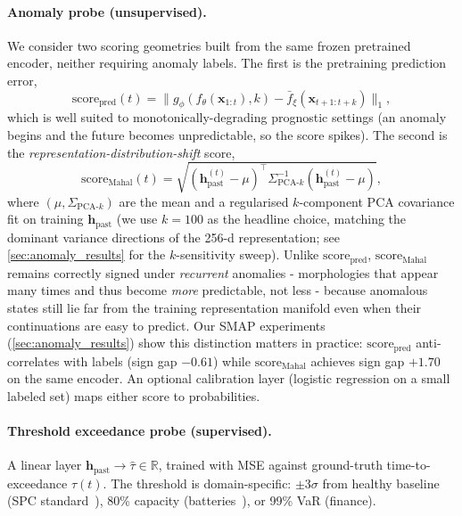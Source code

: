 \documentclass{article}
\newcommand{\R}{\mathbb{R}}
\newcommand{\x}{\mathbf{x}}
\newcommand{\h}{\mathbf{h}}
\newcommand{\encoder}{f_\theta}
\newcommand{\predictor}{g_\phi}
\newcommand{\target}{\bar{f}_\xi}
\begin{document}
\paragraph{Anomaly probe (unsupervised).}
\label{sec:anomaly_probe}
We consider two scoring geometries built from the same frozen pretrained encoder, neither requiring anomaly labels. The first is the pretraining prediction error,
\begin{equation}
  \text{score}_\text{pred}(t) = \|\predictor(\encoder(\x_{1:t}), k) - \target(\x_{t+1:t+k})\|_1,
  \label{eq:anomaly_score}
\end{equation}
which is well suited to monotonically-degrading prognostic settings (an anomaly begins and the future becomes unpredictable, so the score spikes). The second is the \emph{representation-distribution-shift} score,
\begin{equation}
  \text{score}_\text{Mahal}(t) = \sqrt{(\h_\text{past}^{(t)} - \mu)^\top \Sigma_{\text{PCA-}k}^{-1} (\h_\text{past}^{(t)} - \mu)},
  \label{eq:mahalanobis_score}
\end{equation}
where $(\mu, \Sigma_{\text{PCA-}k})$ are the mean and a regularised $k$-component PCA covariance fit on training $\h_\text{past}$ (we use $k=100$ as the headline choice, matching the dominant variance directions of the 256-d representation; see \cref{sec:anomaly_results} for the $k$-sensitivity sweep). Unlike $\text{score}_\text{pred}$, $\text{score}_\text{Mahal}$ remains correctly signed under \emph{recurrent} anomalies - morphologies that appear many times and thus become \emph{more} predictable, not less - because anomalous states still lie far from the training representation manifold even when their continuations are easy to predict. Our SMAP experiments (\cref{sec:anomaly_results}) show this distinction matters in practice: $\text{score}_\text{pred}$ anti-correlates with labels (sign gap $-0.61$) while $\text{score}_\text{Mahal}$ achieves sign gap $+1.70$ on the same encoder. An optional calibration layer (logistic regression on a small labeled set) maps either score to probabilities.

\paragraph{Threshold exceedance probe (supervised).} A linear layer $\h_\text{past} \to \hat{\tau} \in \R$, trained with MSE against ground-truth time-to-exceedance $\tau(t)$. The threshold is domain-specific: $\pm 3\sigma$ from healthy baseline (SPC standard~\citep{montgomery2020spc}), 80\% capacity (batteries~\citep{severson2019battery}), or 99\% VaR (finance).
\end{document}
